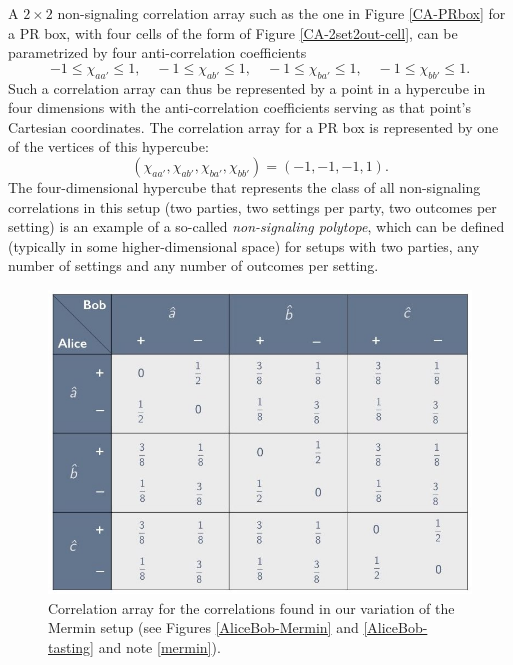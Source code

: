 A $2 \times 2$ non-signaling correlation array such as the one in Figure \ref{CA-PRbox} for a PR box, with four cells of the form of Figure \ref{CA-2set2out-cell}, can be parametrized by four anti-correlation coefficients
\begin{equation}
-1 \le \chi_{aa'} \le 1, \quad -1 \le \chi_{ab'} \le 1, \quad -1 \le \chi_{ba'} \le 1, \quad -1 \le \chi_{bb'} \le 1.
\label{chi values for PR box}
\end{equation}
Such a correlation array can thus be represented by a point in a hypercube in four dimensions with the anti-correlation coefficients serving as that point's Cartesian coordinates. The correlation array for a PR box is represented by one of the vertices of this hypercube: 
\begin{equation}
(\chi_{aa'}, \chi_{ab'}, \chi_{ba'}, \chi_{bb'}) = (-1, -1, -1, 1).
\label{PR box vertices}
\end{equation}
The four-dimensional hypercube that represents the class of all non-signaling correlations in this setup (two parties, two settings per party, two outcomes per setting) is an example of a so-called \emph{non-signaling polytope}, which can be defined (typically in some higher-dimensional space) for setups with two parties, any number of settings and any number of outcomes per setting. 

\begin{figure}[h]
 \centering
   \includegraphics[width=5in]{CA-3set2out-Mermin.jpeg} 
   \caption{Correlation array for the correlations found in our variation of the Mermin setup (see Figures \ref{AliceBob-Mermin} and \ref{AliceBob-tasting} and note \ref{mermin}).}
   \label{CA-3set2out-Mermin}
\end{figure}

